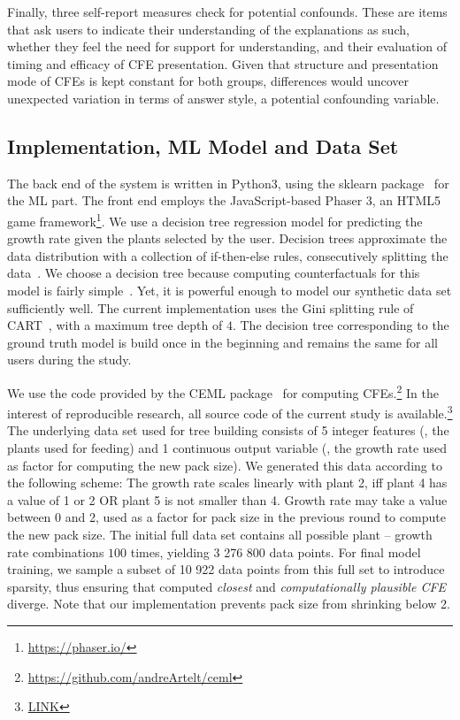 Finally, three self-report measures check for potential confounds. 
These are items that ask users to indicate their understanding of the explanations as such, whether they feel the need for support for understanding, and their evaluation of timing and efficacy of \gls{CFE} presentation.
Given that structure and presentation mode of \glspl{CFE} is kept constant for both groups, differences would uncover unexpected variation in terms of answer style, a potential confounding variable.

\subsection{Implementation, ML Model and Data Set}
The back end of the system is written in Python3, using the sklearn package~\citep{pedregosa_scikit-learn_2011} for the \gls{ML} part. The front end employs the JavaScript-based Phaser 3, an HTML5 game framework\footnote{\url{https://phaser.io/}}.
We use a decision tree regression model for predicting the growth rate given the plants selected by the user.
Decision trees approximate the data distribution with a collection of if-then-else rules, consecutively splitting the data~\citep{shalev-shwartz_understanding_2014}.
We choose a decision tree because computing counterfactuals for this model is fairly simple~\citep{artelt_computation_2019}.
Yet, it is powerful enough to model our synthetic data set sufficiently well.
The current implementation uses the Gini splitting rule of CART~\citep{breiman_classification_1984}, with a maximum tree depth of $4$.
The decision tree corresponding to the ground truth model is build once in the beginning and remains the same for all users during the study. 

We use the code provided by the CEML package~\citep{artelt_ceml_2019} for computing \glspl{CFE}.\footnote{\url{https://github.com/andreArtelt/ceml}}
In the interest of reproducible research, all source code of the current study is available.\footnote{\url{LINK}} 
The underlying data set used for tree building consists of 5 integer features (\ie, the plants used for feeding) and 1 continuous output variable (\ie, the growth rate used as factor for computing the new pack size).
We generated this data according to the following scheme: The growth rate scales linearly with plant 2, iff plant 4 has a value of 1 or 2 OR plant 5 is not smaller than 4. 
Growth rate may take a value between 0 and 2, used as a factor for pack size in the previous round to compute the new pack size.
The initial full data set contains all possible plant -- growth rate combinations $100$ times, yielding 3 276 800 data points. 
For final model training, we sample a subset of 10 922 data points from this full set to introduce sparsity, thus ensuring that computed \textit{closest} and \textit{computationally plausible \gls{CFE}} diverge.
Note that our implementation prevents pack size from shrinking below 2.


